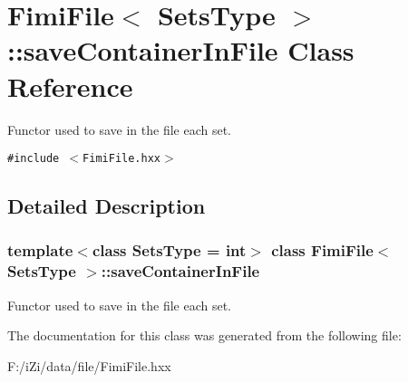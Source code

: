 \section{Fimi\-File$<$ Sets\-Type $>$::save\-Container\-In\-File Class Reference}
\label{class_fimi_file_1_1save_container_in_file}
Functor used to save in the file each set.  


{\tt \#include $<$Fimi\-File.hxx$>$}



\subsection{Detailed Description}
\subsubsection*{template$<$class Sets\-Type = int$>$ class Fimi\-File$<$ Sets\-Type $>$::save\-Container\-In\-File}

Functor used to save in the file each set. 



The documentation for this class was generated from the following file:\begin{CompactItemize}
\item 
F:/i\-Zi/data/file/Fimi\-File.hxx\end{CompactItemize}
